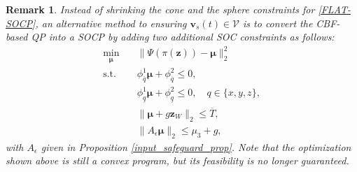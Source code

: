 \documentclass[journal,10pt]{IEEEtran}
\newtheorem{remark}{\bfseries Remark}
\newcommand{\vect}[1]{\boldsymbol{\mathbf{#1}}}
\begin{document}
\begin{remark}\label{remark12}
Instead of  shrinking the cone  and the sphere  constraints for \eqref{FLAT-SOCP}, 
an alternative method to ensuring $\vect{v}_s(t)\in\mathcal{V}$ is to convert the CBF-based QP into a SOCP by adding two additional SOC constraints as follows:
\begin{align*} %
    \min_{\vect{\mu}} \quad & \|\Psi(\pi(\vect{z})) - \vect{\mu}\|_2^2\\
    \text{s.t.} \quad &  \phi_{\overline{q}}^1\vect{\mu}+\phi_{\overline{q}}^2\leq 0,\nonumber\\ 
     &\phi_{\underline{q}}^1\vect{\mu}+\phi_{\underline{q}}^2\leq 0,\quad q\in\{x,y,z\},\nonumber\\
     &\|\vect{\mu}+g\vect{z}_W\|_2\leq \overline{T},\\
     &\|A_{\epsilon}\vect{\mu}\|_2\leq \mu_3+g,
\end{align*}
with $A_{\epsilon}$ given in Proposition \ref{input_safeguard_prop}. Note that the optimization shown above is still a convex program, but its feasibility is no longer guaranteed.


\end{remark}
\end{document}
